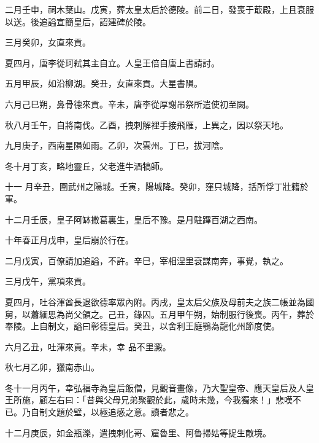 \begin{pinyinscope}
 二月壬申，祠木葉山。戊寅，葬太皇太后於德陵。前二日，發喪于菆殿，上且衰服以送。後追謚宣簡皇后，詔建碑於陵。



 三月癸卯，女直來貢。



 夏四月，唐李從珂弒其主自立。人皇王倍自唐上書請討。



 五月甲辰，如沿柳湖。癸丑，女直來貢。大星書隕。



 六月己巳朔，鼻骨德來貢。辛未，唐李從厚謝吊祭所遣使初至闕。



 秋八月壬午，自將南伐。乙酉，拽刺解裡手接飛雁，上異之，因以祭天地。



 九月庚子，西南星隕如雨。乙卯，次雲州。丁巳，拔河陰。



 冬十月丁亥，略地靈丘，父老進牛酒犒師。



 十一
 月辛丑，圍武州之陽城。壬寅，陽城降。癸卯，窪只城降，括所俘丁壯籍於軍。



 十二月壬辰，皇子阿缽撒葛裏生，皇后不豫。是月駐蹕百湖之西南。



 十年春正月戊申，皇后崩於行在。



 二月戊寅，百僚請加追謚，不許。辛巳，宰相涅里袞謀南奔，事覺，執之。



 三月戊午，黨項來貢。



 夏四月，吐谷渾酋長退欲德率眾內附。丙戌，皇太后父族及母前夫之族二帳並為國舅，以蕭緬思為尚父領之。己丑，錄囚。五月甲午朔，始制服行後喪。丙午，葬於奉陵。上自制文，謚曰彰德皇后。癸丑，以舍利王庭鶚為龍化州節度使。



 六月乙丑，吐渾來貢。辛未，幸
 品不里澱。



 秋七月乙卯，獵南赤山。



 冬十一月丙午，幸弘福寺為皇后飯僧，見觀音畫像，乃大聖皇帝、應天皇后及人皇王所施，顧左右曰：「昔與父母兄弟聚觀於此，歲時未幾，今我獨來！」悲嘆不已。乃自制文題於壁，以極追感之意。讀者悲之。



 十二月庚辰，如金瓶濼，遣拽刺化哥、窟魯里、阿魯掃姑等捉生敵境。




\end{pinyinscope}
